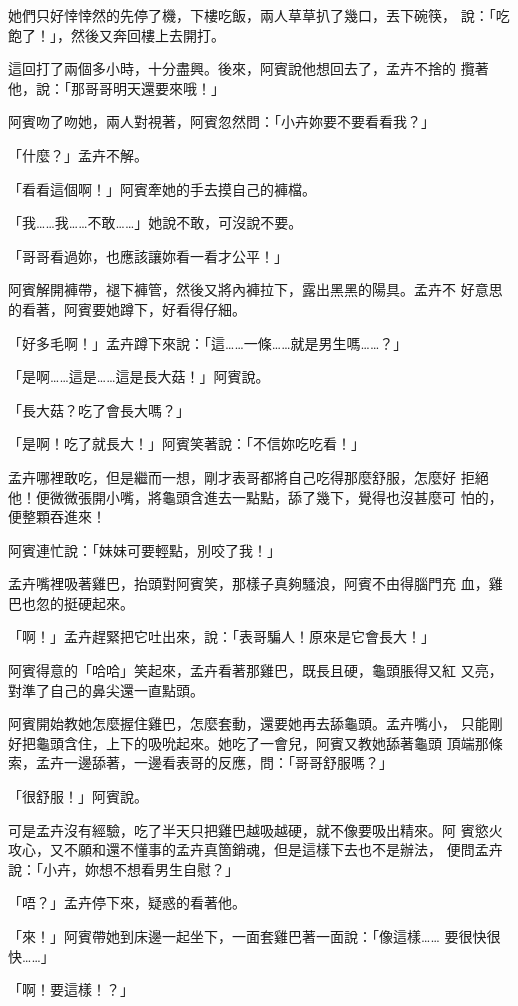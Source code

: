 她們只好悻悻然的先停了機，下樓吃飯，兩人草草扒了幾口，丟下碗筷，
說：「吃飽了！」，然後又奔回樓上去開打。

這回打了兩個多小時，十分盡興。後來，阿賓說他想回去了，孟卉不捨的
攬著他，說：「那哥哥明天還要來哦！」

阿賓吻了吻她，兩人對視著，阿賓忽然問：「小卉妳要不要看看我？」

「什麼？」孟卉不解。

「看看這個啊！」阿賓牽她的手去摸自己的褲檔。

「我……我……不敢……」她說不敢，可沒說不要。

「哥哥看過妳，也應該讓妳看一看才公平！」

阿賓解開褲帶，褪下褲管，然後又將內褲拉下，露出黑黑的陽具。孟卉不
好意思的看著，阿賓要她蹲下，好看得仔細。

「好多毛啊！」孟卉蹲下來說：「這……一條……就是男生嗎……？」

「是啊……這是……這是長大菇！」阿賓說。

「長大菇？吃了會長大嗎？」

「是啊！吃了就長大！」阿賓笑著說：「不信妳吃吃看！」

孟卉哪裡敢吃，但是繼而一想，剛才表哥都將自己吃得那麼舒服，怎麼好
拒絕他！便微微張開小嘴，將龜頭含進去一點點，舔了幾下，覺得也沒甚麼可
怕的，便整顆吞進來！

阿賓連忙說：「妹妹可要輕點，別咬了我！」

孟卉嘴裡吸著雞巴，抬頭對阿賓笑，那樣子真夠騷浪，阿賓不由得腦門充
血，雞巴也忽的挺硬起來。

「啊！」孟卉趕緊把它吐出來，說：「表哥騙人！原來是它會長大！」

阿賓得意的「哈哈」笑起來，孟卉看著那雞巴，既長且硬，龜頭脹得又紅
又亮，對準了自己的鼻尖還一直點頭。

阿賓開始教她怎麼握住雞巴，怎麼套動，還要她再去舔龜頭。孟卉嘴小，
只能剛好把龜頭含住，上下的吸吮起來。她吃了一會兒，阿賓又教她舔著龜頭
頂端那條索，孟卉一邊舔著，一邊看表哥的反應，問：「哥哥舒服嗎？」

「很舒服！」阿賓說。

可是孟卉沒有經驗，吃了半天只把雞巴越吸越硬，就不像要吸出精來。阿
賓慾火攻心，又不願和還不懂事的孟卉真箇銷魂，但是這樣下去也不是辦法，
便問孟卉說：「小卉，妳想不想看男生自慰？」

「唔？」孟卉停下來，疑惑的看著他。

「來！」阿賓帶她到床邊一起坐下，一面套雞巴著一面說：「像這樣……
要很快很快……」

「啊！要這樣！？」

